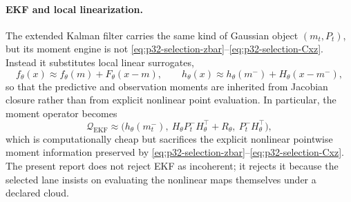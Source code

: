 \documentclass[11pt]{article}
\numberwithin{equation}{section}
\begin{document}
\paragraph{EKF and local linearization.}
The extended Kalman filter carries the same kind of Gaussian object
\((m_t,P_t)\), but its moment engine is not
\eqref{eq:p32-selection-zbar}--\eqref{eq:p32-selection-Cxz}.  Instead it
substitutes local linear surrogates,
\begin{equation}
  f_\theta(x)\approx f_\theta(m)+F_\theta(x-m),
  \qquad
  h_\theta(x)\approx h_\theta(m^-)+H_\theta(x-m^-),
  \label{eq:p32-selection-ekf-linearization}
\end{equation}
so that the predictive and observation moments are inherited from Jacobian
closure rather than from explicit nonlinear point evaluation.  In particular,
the moment operator becomes
\begin{equation}
  \mathcal Q_{\mathrm{EKF}}
  \approx
  \bigl(h_\theta(m_t^-),\ H_\theta P_t^- H_\theta^\top +R_\theta,\ P_t^-H_\theta^\top\bigr),
  \label{eq:p32-selection-ekf-operator}
\end{equation}
which is computationally cheap but sacrifices the explicit nonlinear pointwise
moment information preserved by \eqref{eq:p32-selection-zbar}--\eqref{eq:p32-selection-Cxz}.  The present
report does not reject EKF as incoherent; it rejects it because the selected lane
insists on evaluating the nonlinear maps themselves under a declared cloud.
\end{document}
